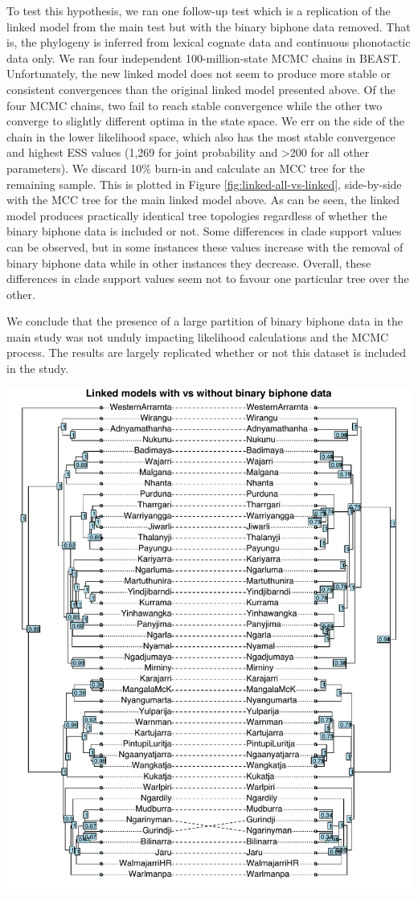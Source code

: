 \documentclass[]{article}
\begin{document}
To test this hypothesis, we ran one follow-up test which is a replication of the linked model from the main test but with the binary biphone data removed. That is, the phylogeny is inferred from lexical cognate data and continuous phonotactic data only. We ran four independent 100-million-state MCMC chains in BEAST. Unfortunately, the new linked model does not seem to produce more stable or consistent convergences than the original linked model presented above. Of the four MCMC chains, two fail to reach stable convergence while the other two converge to slightly different optima in the state space. We err on the side of the chain in the lower likelihood space, which also has the most stable convergence and highest ESS values (1,269 for joint probability and \textgreater{}200 for all other parameters). We discard 10\% burn-in and calculate an MCC tree for the remaining sample. This is plotted in Figure \ref{fig:linked-all-vs-linked}, side-by-side with the MCC tree for the main linked model above. As can be seen, the linked model produces practically identical tree topologies regardless of whether the binary biphone data is included or not. Some differences in clade support values can be observed, but in some instances these values increase with the removal of binary biphone data while in other instances they decrease. Overall, these differences in clade support values seem not to favour one particular tree over the other.

We conclude that the presence of a large partition of binary biphone data in the main study was not unduly impacting likelihood calculations and the MCMC process. The results are largely replicated whether or not this dataset is included in the study.

\includegraphics{fig/linked_all_vs_linked.pdf}
\end{document}
